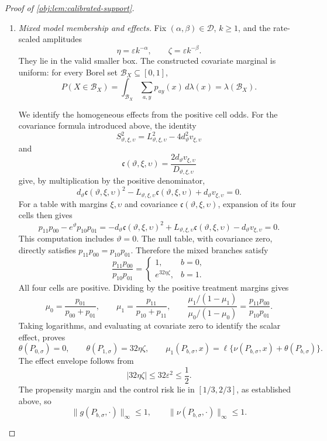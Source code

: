 \begin{proof}[Proof of \cref{obj:lem:calibrated-support}]
\begin{enumerate}
\item \textit{Mixed model membership and effects.}
Fix \((\alpha,\beta)\in\mathcal D\), \(k\ge1\), and the rate-scaled amplitudes
\[
\eta=\varepsilon k^{-\alpha},\qquad
\zeta=\varepsilon k^{-\beta}.
\]
They lie in the valid smaller box. The constructed covariate marginal is uniform: for every Borel set \(\mathcal B_X\subseteq[0,1]\),
\[
P(X\in\mathcal B_X)
=\int_{\mathcal B_X}\sum_{a,y}p_{ay}(x)\,d\lambda(x)
=\lambda(\mathcal B_X).
\]

We identify the homogeneous effects from the positive cell odds. For the covariance formula introduced above, the identity
\[
S_{\vartheta,\xi,\upsilon}^2
=L_{\vartheta,\xi,\upsilon}^2
 -4d_\vartheta^2v_{\xi,\upsilon}
\]
and
\[
\mathfrak c(\vartheta,\xi,\upsilon)
=\frac{2d_\vartheta v_{\xi,\upsilon}}
       {D_{\vartheta,\xi,\upsilon}}
\]
give, by multiplication by the positive denominator,
\[
d_\vartheta\mathfrak c(\vartheta,\xi,\upsilon)^2
-L_{\vartheta,\xi,\upsilon}\mathfrak c(\vartheta,\xi,\upsilon)
+d_\vartheta v_{\xi,\upsilon}=0.
\]
For a table with margins \(\xi,\upsilon\) and covariance
\(\mathfrak c(\vartheta,\xi,\upsilon)\), expansion of its four cells then gives
\[
p_{11}p_{00}-e^\vartheta p_{10}p_{01}
=-d_\vartheta\mathfrak c(\vartheta,\xi,\upsilon)^2
 +L_{\vartheta,\xi,\upsilon}\mathfrak c(\vartheta,\xi,\upsilon)
 -d_\vartheta v_{\xi,\upsilon}=0.
\]
This computation includes \(\vartheta=0\). The null table, with covariance zero, directly satisfies
\(p_{11}p_{00}=p_{10}p_{01}\). Therefore the mixed branches satisfy
\[
\frac{p_{11}p_{00}}{p_{10}p_{01}}
=
\begin{cases}
1,&b=0,\\
e^{32\eta\zeta},&b=1.
\end{cases}
\]
All four cells are positive. Dividing by the positive treatment margins gives
\[
\mu_0=\frac{p_{01}}{p_{00}+p_{01}},
\qquad
\mu_1=\frac{p_{11}}{p_{10}+p_{11}},
\qquad
\frac{\mu_1/(1-\mu_1)}{\mu_0/(1-\mu_0)}
=\frac{p_{11}p_{00}}{p_{10}p_{01}}.
\]
Taking logarithms, and evaluating at covariate zero to identify the scalar effect, proves
\[
\theta(P_{0,\sigma})=0,\qquad
\theta(P_{1,\sigma})=32\eta\zeta,
\qquad
\mu_1(P_{b,\sigma},x)
=\ell\{\nu(P_{b,\sigma},x)+\theta(P_{b,\sigma})\}.
\]
The effect envelope follows from
\[
|32\eta\zeta|\le32\varepsilon^2\le\frac12.
\]
The propensity margin and the control risk lie in \([1/3,2/3]\), as established above, so
\[
\|g(P_{b,\sigma},\cdot)\|_\infty\le1,
\qquad
\|\nu(P_{b,\sigma},\cdot)\|_\infty\le1.
\]


\end{enumerate}
\end{proof}

